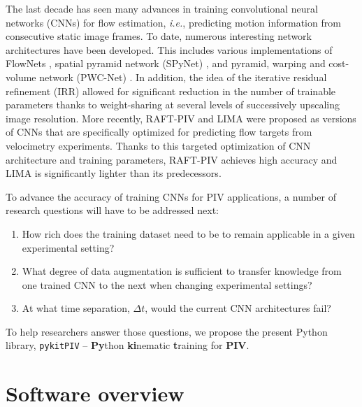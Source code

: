\documentclass[a4paper,fleqn]{cas-dc}
\begin{document}
The last decade has seen many advances in training convolutional neural networks (CNNs) for flow estimation, \textit{i.e.}, predicting motion information from consecutive static image frames. To date, numerous interesting network architectures have been developed. This includes various implementations of FlowNets \citep{dosovitskiy2015flownet, ilg2017flownet, hui2018liteflownet}, spatial pyramid network (SPyNet) \cite{ranjan2017optical}, and pyramid, warping and cost-volume network (PWC-Net) \cite{sun2018pwc}. In addition, the idea of the iterative residual refinement (IRR) \cite{hur2019iterative} allowed for significant reduction in the number of trainable parameters thanks to weight-sharing at several levels of successively upscaling image resolution. More recently, RAFT-PIV \cite{lagemann2021deep} and LIMA \citep{manickathan2023lightweight} were proposed as versions of CNNs that are specifically optimized for predicting flow targets from velocimetry experiments. Thanks to this targeted optimization of CNN architecture and training parameters, RAFT-PIV achieves high accuracy and LIMA is significantly lighter than its predecessors.

To advance the accuracy of training CNNs for PIV applications, a number of research questions will have to be addressed next:
\begin{enumerate}
\item How rich does the training dataset need to be to remain applicable in a given experimental setting?
\item What degree of data augmentation is sufficient to transfer knowledge from one trained CNN to the next when changing experimental settings?
\item At what time separation, $\Delta t$, would the current CNN architectures fail?
\end{enumerate}
To help researchers answer those questions, we propose the present Python library, \texttt{pykitPIV} -- \textbf{Py}thon \textbf{ki}nematic \textbf{t}raining for \textbf{PIV}.



\section{Software overview} \label{sec:software}



\end{document}
